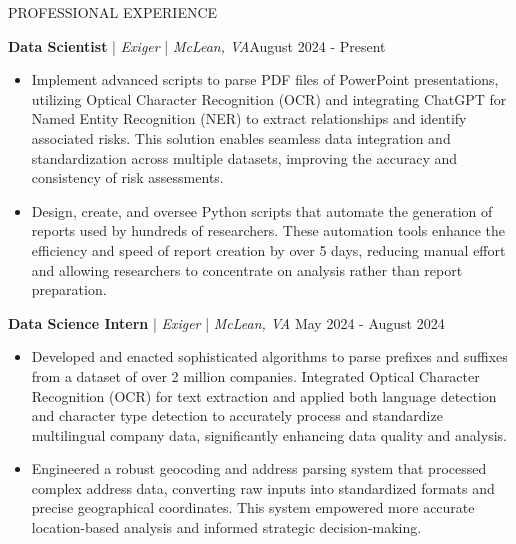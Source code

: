 \begin{rSection}{PROFESSIONAL EXPERIENCE}
    \renewcommand{\labelitemi}{\rule{0.8ex}{0.8ex}}

    \textbf{Data Scientist} | \textit{Exiger} | \textit{McLean, VA}\hfill August 2024 - Present\\
    \begin{itemize}[leftmargin=12pt]
        \itemsep -4pt {} \vspace{-1.4em}
        \item Implement advanced scripts to parse PDF files of PowerPoint presentations, utilizing Optical Character Recognition (OCR) and integrating ChatGPT for Named Entity Recognition (NER) to extract relationships and identify associated risks. This solution enables seamless data integration and standardization across multiple datasets, improving the accuracy and consistency of risk assessments.
        \item Design, create, and oversee Python scripts that automate the generation of reports used by hundreds of researchers. These automation tools enhance the efficiency and speed of report creation by over 5 days, reducing manual effort and allowing researchers to concentrate on analysis rather than report preparation.
    \end{itemize}
    
    \textbf{Data Science Intern} | \textit{Exiger} | \textit{McLean, VA} \hfill May 2024 - August 2024\\
    \begin{itemize}[leftmargin=12pt]
        \itemsep -4pt {} \vspace{-1.4em}
        \item Developed and enacted sophisticated algorithms to parse prefixes and suffixes from a dataset of over 2 million companies. Integrated Optical Character Recognition (OCR) for text extraction and applied both language detection and character type detection to accurately process and standardize multilingual company data, significantly enhancing data quality and analysis.
        \item Engineered a robust geocoding and address parsing system that processed complex address data, converting raw inputs into standardized formats and precise geographical coordinates. This system empowered more accurate location-based analysis and informed strategic decision-making.
    \end{itemize}
    

\end{rSection}
